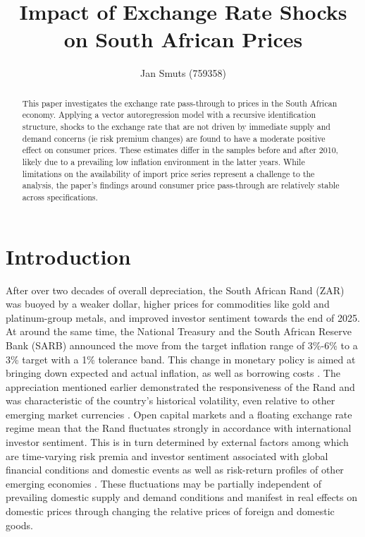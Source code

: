 \documentclass[12pt]{article}
\title{Impact of Exchange Rate Shocks on South African Prices}
\author{Jan Smuts (759358)}
\begin{document}
\maketitle

\vspace{-2.2em}

\begin{abstract}

This paper investigates the exchange rate pass-through to prices in the South African economy. Applying a vector autoregression model with a recursive identification structure, shocks to the exchange rate that are not driven by immediate supply and demand concerns (ie risk premium changes) are found to have a moderate positive effect on consumer prices. These estimates differ in the samples before and after 2010, likely due to a prevailing low inflation environment in the latter years. While limitations on the availability of import price series represent a challenge to the analysis, the paper's findings around consumer price pass-through are relatively stable across specifications. 

\end{abstract}

\pagebreak

\tableofcontents

\pagebreak
\section{Introduction}
After over two decades of overall depreciation, the South African Rand (ZAR) was buoyed by a weaker dollar, higher prices for commodities like gold and platinum-group metals, and improved investor sentiment towards the end of 2025. At around the same time, the National Treasury and the South African Reserve Bank (SARB) announced the move from the target inflation range of 3\%-6\% to a 3\% target with a 1\% tolerance band. This change in monetary policy is aimed at bringing down expected and actual inflation, as well as borrowing costs \parencite{sa_infl}. The appreciation mentioned earlier demonstrated the responsiveness of the Rand and was characteristic of the country's historical volatility, even relative to other emerging market currencies \parencite{Hassan2015}. Open capital markets and a floating exchange rate regime mean that the Rand fluctuates strongly in accordance with international investor sentiment. This is in turn determined by  external factors among which are time-varying risk premia  and investor sentiment associated with global financial conditions and domestic events as well as risk-return profiles of other emerging economies \parencite{kalemliozcan2019spillovers, greenwoodNimmo2021}. These fluctuations may be partially independent of prevailing domestic supply and demand conditions and manifest in real effects on domestic prices through changing the relative prices of foreign and domestic goods. 
\end{document}
